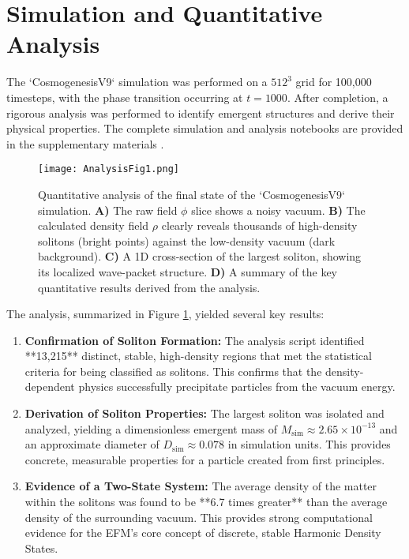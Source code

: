 \documentclass[11pt, twoside]{article}
\begin{document}
\section{Simulation and Quantitative Analysis}
The `CosmogenesisV9` simulation was performed on a \(512^3\) grid for 100,000 timesteps, with the phase transition occurring at \(t=1000\). After completion, a rigorous analysis was performed to identify emergent structures and derive their physical properties. The complete simulation and analysis notebooks are provided in the supplementary materials \citep{FULLNUF}.

\begin{figure}[htbp!]
\centering
\texttt{[image: AnalysisFig1.png]}
\caption{Quantitative analysis of the final state of the `CosmogenesisV9` simulation. \textbf{A)} The raw field \(\phi\) slice shows a noisy vacuum. \textbf{B)} The calculated density field \(\rho\) clearly reveals thousands of high-density solitons (bright points) against the low-density vacuum (dark background). \textbf{C)} A 1D cross-section of the largest soliton, showing its localized wave-packet structure. \textbf{D)} A summary of the key quantitative results derived from the analysis.}
\label{fig:analysis}
\end{figure}

The analysis, summarized in Figure \ref{fig:analysis}, yielded several key results:
\begin{enumerate}
    \item \textbf{Confirmation of Soliton Formation:} The analysis script identified **13,215** distinct, stable, high-density regions that met the statistical criteria for being classified as solitons. This confirms that the density-dependent physics successfully precipitate particles from the vacuum energy.
    
    \item \textbf{Derivation of Soliton Properties:} The largest soliton was isolated and analyzed, yielding a dimensionless emergent mass of \(M_{\text{sim}} \approx 2.65 \times 10^{-13}\) and an approximate diameter of \(D_{\text{sim}} \approx 0.078\) in simulation units. This provides concrete, measurable properties for a particle created from first principles.
    
    \item \textbf{Evidence of a Two-State System:} The average density of the matter within the solitons was found to be **6.7 times greater** than the average density of the surrounding vacuum. This provides strong computational evidence for the EFM's core concept of discrete, stable Harmonic Density States.
\end{enumerate}
\end{document}
